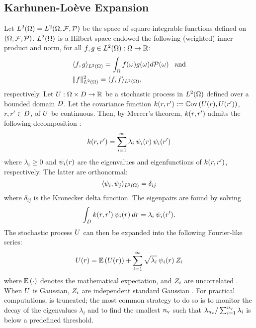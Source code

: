 \subsection{Karhunen-Lo\`{e}ve Expansion} 
Let ${L^{2}(\Omega)} = L^{2}(\Omega, \mathcal{F}, \mathcal{P})$ be the space of square-integrable functions defined on $(\Omega, \mathcal{F}, \mathcal{P})$. ${L^{2}(\Omega)}$ is a Hilbert space endowed the following (weighted) inner product and norm, for all $f, g \in {L^{2}(\Omega)}: \Omega \to \mathbb{R}$:
\begin{align*}
  & \langle f, g \rangle_{L^{2}(\Omega)} = \int_{\Omega} f(\omega) g(\omega) d\mathcal{P}(\omega) \;\;\; \text{and} \\
  & \| f \|^2_{L^{2}(\Omega)} = \langle f, f \rangle_{L^{2}(\Omega)},
\end{align*}
respectively. Let $U: \Omega \times D \to \mathbb{R}$ be a stochastic process in ${L^{2}(\Omega)}$ defined over a bounded domain $D$. Let the covariance function $\fCov{\r, \r'} := \Cov{\U(\r), \U(\r')}$, $r, r' \in D$, of $U$ be continuous. Then, by Mercer's theorem, $\fCov{\r, \r'}$ admits the following decomposition \cite{maitre2010}:
\[
  \fCov{\r, \r'} = \sum_{i = 1}^\infty \lambda_i \: \klb_i(\r) \: \klb_i(\r')
\]
where $\lambda_i \geq 0$ and $\psi_i(r)$ are the eigenvalues and eigenfunctions of $\fCov{\r, \r'}$, respectively. The latter are orthonormal:
\[
  \langle \psi_i, \psi_j \rangle_{L^{2}(\Omega)} = \delta_{ij}
\]
where $\delta_{ij}$ is the Kronecker delta function. The eigenpairs are found by solving
\begin{equation} \elabel{kl-eigenpairs}
  \int_\domain \fCov{\r, \r'} \: \klb_i (\r) \: \d\r = \lambda_i \: \klb_i(\r').
\end{equation}
The stochastic process $U$ can then be expanded into the following Fourier-like series:
\begin{equation} \elabel{kl-expansion}
  \U(\r) = \E{\U(\r)} + \sum_{i = 1}^\infty \sqrt{\lambda_i} \: \klb_i(\r) \: \Z_i
\end{equation}
where $\mathbb{E}\left( \cdot \right)$ denotes the mathematical expectation, and $Z_i$ are uncorrelated \rvs. When $U$ is Gaussian, $Z_i$ are independent standard Gaussian \rvs. For practical computations,  is truncated; the most common strategy to do so is to monitor the decay of the eigenvalues $\lambda_i$ and to find the smallest ${n_\text{v}}$ such that $\lambda_{n_\text{v}} / \sum_{i = 1}^{n_\text{v}} \lambda_i$ is below a predefined threshold.

